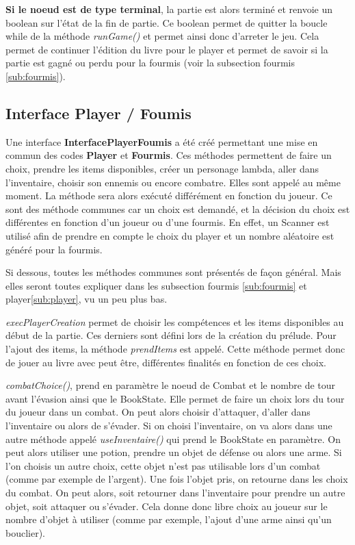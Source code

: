 		\textbf{Si le noeud est de type terminal}, la partie est alors terminé et renvoie un boolean sur l'état de la fin de partie. Ce boolean permet de quitter la boucle while de la méthode \textit{runGame()} et permet ainsi donc d'arreter le jeu. Cela permet de continuer l'édition du livre pour le player et permet de savoir si la partie est gagné ou perdu pour la fourmis (voir la subsection fourmis \ref{sub:fourmis}).

	\subsection{Interface Player / Foumis}
		Une interface \textbf{InterfacePlayerFoumis} a été créé permettant une mise en commun des codes \textbf{Player} et \textbf{Fourmis}. Ces méthodes permettent de faire un choix, prendre les items disponibles, créer un personage lambda, aller dans l'inventaire, choisir son ennemis ou encore combatre. Elles sont appelé au même moment. La méthode sera alors exécuté différément en fonction du joueur. Ce sont des méthode communes car un choix est demandé, et la décision du choix est différentes en fonction d'un joueur ou d'une fourmis. En effet, un Scanner est utilisé afin de prendre en compte le choix du player et un nombre aléatoire est généré pour la fourmis.

		Si dessous, toutes les méthodes communes sont présentés de façon général. Mais elles seront toutes expliquer dans les subsection fourmis \ref{sub:fourmis} et player\ref{sub:player}, vu un peu plus bas.

		\textit{execPlayerCreation} permet de choisir les compétences et les items disponibles au début de la partie. Ces derniers sont défini lors de la création du prélude. Pour l'ajout des items, la méthode \textit{prendItems} est appelé. Cette méthode permet donc de jouer au livre avec peut être, différentes finalités en fonction de ces choix.

		\textit{combatChoice()}, prend en paramètre le noeud de Combat et le nombre de tour avant l'évasion ainsi que le BookState. Elle permet de faire un choix lors du tour du joueur dans un combat. On peut alors choisir d'attaquer, d'aller dans l'inventaire ou alors de s'évader. Si on choisi l'inventaire, on va alors dans une autre méthode appelé \textit{useInventaire()} qui prend le BookState en paramètre. On peut alors utiliser une potion, prendre un objet de défense ou alors une arme. Si l'on choisis un autre choix, cette objet n'est pas utilisable lors d'un combat (comme par exemple de l'argent). Une fois l'objet pris, on retourne dans les choix du combat. On peut alors, soit retourner dans l'inventaire pour prendre un autre objet, soit attaquer ou s'évader. Cela donne donc libre choix au joueur sur le nombre d'objet à utiliser (comme par exemple, l'ajout d'une arme ainsi qu'un bouclier).

